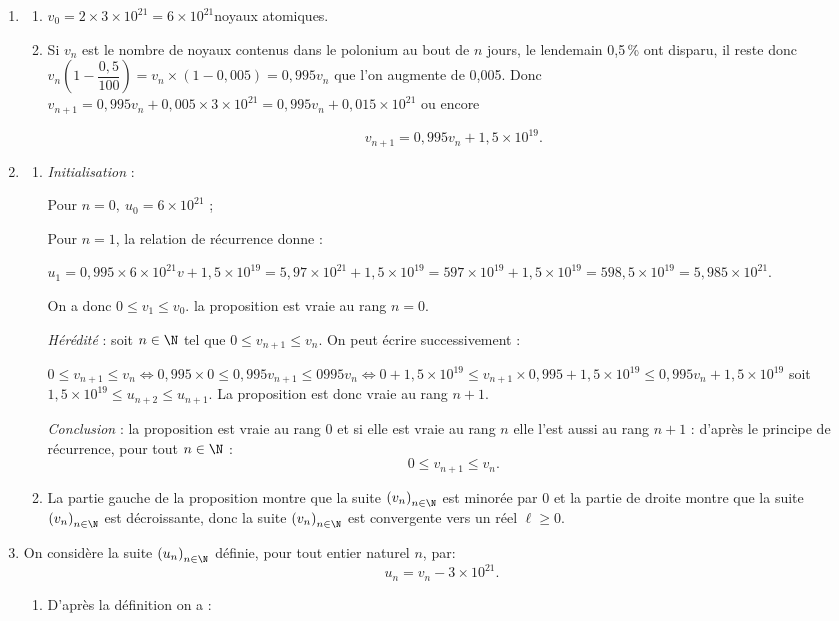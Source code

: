 \begin{enumerate}
\item 
	\begin{enumerate}
		\item 
$v_0 = 2 \times 3 \times 10^{21} = 6 \times 10^{21}$noyaux atomiques.
		\item 
Si $v_n$ est le nombre de noyaux contenus dans le polonium au bout de $n$ jours, le lendemain 0,5\,\% ont disparu, il reste donc $v_n \left( 1 -\dfrac{0,5}{100}\right)  = v_n \times (1 - 0,005) = 0,995v_n$ que l'on augmente de 0,005. Donc $v_{n+1} = 0,995v_n + 0,005 \times 3 \times 10^{21} = 0,995v_n + 0,015 \times 10^{21}$ ou encore 

\[v_{n+1} = 0,995v_n + 1,5 \times 10^{19}.\]
	\end{enumerate}
\item 
	\begin{enumerate}
		\item 
\emph{Initialisation} :

Pour $n = 0,\:u_0 = 6\times 10^{21}$ ;

Pour $n = 1$, la relation de récurrence donne :

$u_1 = 0,995\times 6\times 10^{21}v + 1,5 \times 10^{19} = 5,97 \times 10^{21} + 1,5 \times 10^{19} = 597 \times 10^{19} + 1,5 \times 10^{19} = 598,5 \times 10^{19} = 5,985 \times 10^{21}$.

On a donc $0\leqslant v_{1}  \leqslant v_0$. la proposition est vraie au rang $n = 0$.

\emph{Hérédité} : soit $n \in \N$ tel que $0 \leqslant v_{n+1}  \leqslant v_n$. On peut écrire successivement :	

$0 \leqslant v_{n+1} \leqslant v_n \iff 0,995\times 0 \leqslant 0,995v_{n+1} \leqslant 0995v_n \iff 0 + 1,5 \times 10^{19} \leqslant v_{n+1} \times 0,995 + 1,5 \times 10^{19} \leqslant 0,995v_n + 1,5 \times 10^{19}$ soit $1,5 \times 10^{19} \leqslant u_{n+2} \leqslant u_{n+1}$. La proposition est donc vraie au rang $n + 1$.

\emph{Conclusion }: la proposition est vraie au rang 0 et si elle est vraie au rang $n$ elle l'est aussi au rang $n + 1$ : d'après le principe de récurrence, pour tout $n \in \N$ :
\[0 \leqslant v_{n+1}  \leqslant v_n.\]

		\item 
		
La partie gauche de la proposition montre que la suite $\left(v_n\right)_{n\in \N}$ est minorée par $0$ et la partie de droite montre que la suite $\left(v_n\right)_{n\in \N}$ est décroissante, donc la suite $\left(v_n\right)_{n\in \N}$ est convergente vers un réel $\ell \geqslant 0$.
	\end{enumerate}
\item On considère la suite $\left(u_n\right)_{n \in \N}$ définie, pour tout entier naturel $n$, par: \[u_n = v_n - 3 \times 10^{21}.\]
	\begin{enumerate}
		\item 
D'après la définition on a :


\end{enumerate}
\end{enumerate}

